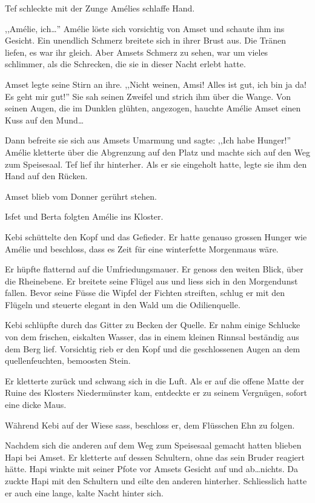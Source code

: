 Tef schleckte mit der Zunge Amélies schlaffe Hand.

,,Amélie, ich\dots '' Amélie löste sich vorsichtig von Amset und schaute ihm ins Gesicht. Ein unendlich Schmerz breitete sich in ihrer Brust aus. Die Tränen liefen, es war ihr gleich. Aber Amsets Schmerz zu sehen, war um vieles schlimmer, als die Schrecken, die sie in dieser Nacht erlebt hatte.

Amset legte seine Stirn an ihre. ,,Nicht weinen, Amsi! Alles ist gut, ich bin ja da! Es geht mir gut!'' Sie sah seinen Zweifel und strich ihm über die Wange. Von seinen Augen, die im Dunklen glühten, angezogen, hauchte Amélie Amset einen Kuss auf den Mund\dots

Dann befreite sie sich aus Amsets Umarmung und sagte: ,,Ich habe Hunger!'' Amélie kletterte über die Abgrenzung auf den Platz und machte sich auf den Weg zum Speisesaal. Tef lief ihr hinterher. Als er sie eingeholt hatte, legte sie ihm den Hand auf den Rücken.

\sterne

Amset blieb vom Donner gerührt stehen. 

\sterne

Isfet und Berta folgten Amélie ins Kloster.

\sterne

Kebi schüttelte den Kopf und das Gefieder. Er hatte genauso grossen Hunger wie Amélie und beschloss, dass es Zeit für eine winterfette Morgenmaus wäre.

Er hüpfte flatternd auf die Umfriedungsmauer. Er genoss den weiten Blick, über die Rheinebene. Er breitete seine Flügel aus und liess sich in den Morgendunst fallen. Bevor seine Füsse die Wipfel der Fichten streiften, schlug er mit den Flügeln und steuerte elegant in den Wald um die Odilienquelle.

Kebi schlüpfte durch das Gitter zu Becken der Quelle. Er nahm einige Schlucke von dem frischen, eiskalten Wasser, das in einem kleinen Rinnsal beständig aus dem Berg lief. Vorsichtig rieb er den Kopf und die geschlossenen Augen an dem quellenfeuchten, bemoosten Stein. 

Er kletterte zurück und schwang sich in die Luft. Als er auf die offene Matte der Ruine des Klosters Niedermünster kam, entdeckte er zu seinem Vergnügen, sofort eine dicke Maus.

Während Kebi auf der Wiese sass, beschloss er, dem Flüsschen Ehn zu folgen.

\sterne

Nachdem sich die anderen auf dem Weg zum Speisesaal gemacht hatten blieben Hapi bei Amset. Er kletterte auf dessen Schultern, ohne das sein Bruder reagiert hätte. Hapi winkte mit seiner Pfote vor Amsets Gesicht auf und ab\dots nichts.
Da zuckte Hapi mit den Schultern und eilte den anderen hinterher. Schliesslich hatte er auch eine lange, kalte Nacht hinter sich.

